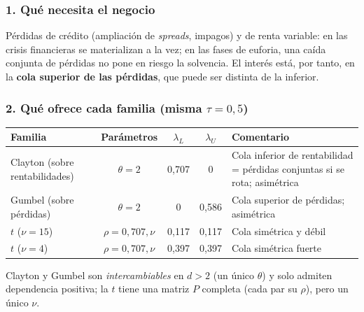\documentclass[a4paper,12pt]{article}
\begin{document}
\subsubsection*{1. Qué necesita el negocio}
Pérdidas de crédito (ampliación de \emph{spreads}, impagos) y de renta variable: en las crisis financieras se materializan a la vez; en las fases de euforia, una caída conjunta de pérdidas no pone en riesgo la solvencia. El interés está, por tanto, en la \textbf{cola superior de las pérdidas}, que puede ser distinta de la inferior.

\subsubsection*{2. Qué ofrece cada familia (misma $\tau=0{,}5$)}
\begin{center}
\small
\begin{tabular}{lcccp{5.6cm}}
\toprule
Familia & Parámetros & $\lambda_L$ & $\lambda_U$ & Comentario\\
\midrule
Clayton (sobre rentabilidades) & $\theta=2$ & 0,707 & 0 & Cola inferior de rentabilidad = pérdidas conjuntas si se rota; asimétrica\\
Gumbel (sobre pérdidas) & $\theta=2$ & 0 & 0,586 & Cola superior de pérdidas; asimétrica\\
$t$ ($\nu=15$) & $\rho=0{,}707,\nu$ & 0,117 & 0,117 & Cola simétrica y débil\\
$t$ ($\nu=4$) & $\rho=0{,}707,\nu$ & 0,397 & 0,397 & Cola simétrica fuerte\\
\bottomrule
\end{tabular}
\end{center}
Clayton y Gumbel son \emph{intercambiables} en $d>2$ (un único $\theta$) y solo admiten dependencia positiva; la $t$ tiene una matriz $P$ completa (cada par su $\rho$), pero un único $\nu$.
\end{document}
